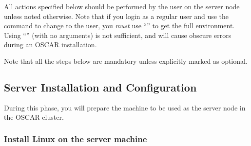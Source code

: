 %
%
%
%
%

\label{sec:detail}

All actions specified below should be performed by the 
user on the server node unless noted otherwise.  Note that if you
login as a regular user and use the  command to change to the
 user, you {\em must} use ``'' to get the full
 environment.  Using ``'' (with no arguments) is
not sufficient, and will cause obscure errors during an
OSCAR installation.

Note that all the steps below are mandatory unless explicitly marked
as optional.



\subsection{Server Installation and Configuration}
\label{det:serverinstall}

During this phase, you will prepare the machine to be used as the
server node in the OSCAR cluster.


\subsubsection{Install Linux on the server machine}
\label{det:serverosinstall}

